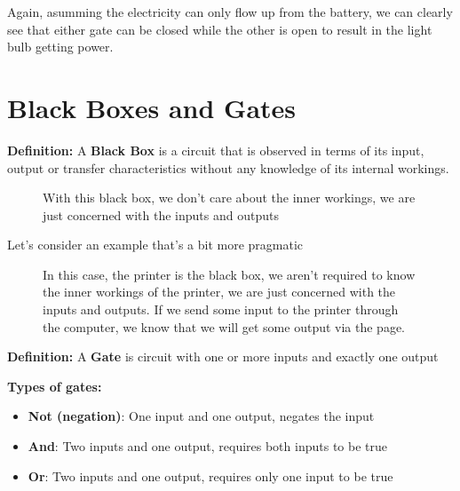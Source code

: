\documentclass{report}
\begin{document}
    \bigbreak \noindent 
    Again, asumming the electricity can only flow up from the battery, we can clearly see that either gate can be closed while the other is open to result in the light bulb getting power. 

    \pagebreak \bigbreak \noindent 
    \section{Black Boxes and Gates}
    \bigbreak \noindent 
    \begin{mdframed}
        \textbf{Definition:}
       A \textbf{Black Box} is a circuit that is observed in terms of its input, output or transfer characteristics without any knowledge of its internal workings.
    \end{mdframed}
    \begin{figure}[ht]
        \begin{minipage}{0.47\textwidth}
        \centering
        \label{fig:blackbox}
        \caption{}
        \label{fig:}
        \end{minipage}
        \begin{minipage}{0.5\textwidth}
        With this black box, we don't care about the inner workings, we are just concerned with the inputs and outputs
        \end{minipage}
    \end{figure}
    \bigbreak \noindent 
    Let's consider an example that's a bit more pragmatic
    \bigbreak \noindent 

\begin{figure}[ht]
    \begin{minipage}{0.47\textwidth}
        \centering
    \label{fig:tryagain}
    \end{minipage}
    \begin{minipage}{0.5\textwidth}
    In this case, the printer is the black box, we aren't required to know the inner workings of the printer, we are just concerned with the inputs and outputs. If we send some input to the printer  through the computer, we know that we will get some output via the page.
    \label{fig:}
    \end{minipage}
\end{figure}
    \bigbreak \noindent 
    \begin{mdframed}
        \textbf{Definition:}
        A \textbf{Gate} is circuit with one or more inputs and exactly one output
    \end{mdframed}
    \textbf{Types of gates:}
    \begin{itemize}
      \item \textbf{Not (negation)}: One input and one output, negates the input
      \item \textbf{And}: Two inputs and one output, requires both inputs to be true
      \item \textbf{Or}: Two inputs and one output, requires only one input to be true
    \end{itemize}
\end{document}
